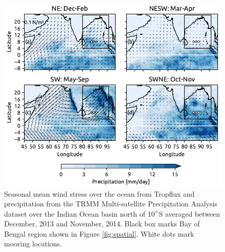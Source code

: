 \documentclass[onecol]{ametsoc}
\begin{document}
\begin{figure}
\centering
\includegraphics[width=33pc]{figure1-ppt.pdf}
\caption{\label{fig:ppt}
Seasonal mean wind stress over the ocean from Tropflux \citep[arrows; ][]{Kumar2012} and precipitation from the TRMM Multi-satellite Precipitation Analysis dataset \citep[color; ][]{trmm} over the Indian Ocean basin north of 10\(\degree\)S averaged between December, 2013 and November, 2014. Black box marks Bay of Bengal region shown in Figure \ref{fig:spatial}. White dots mark mooring locations.}
\end{figure}
\end{document}
